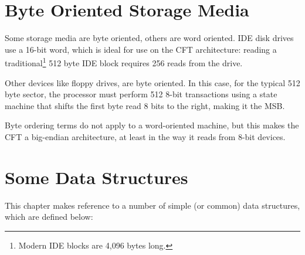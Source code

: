 \section{Byte Oriented Storage Media}

Some storage media are byte oriented, others are word oriented. IDE
disk drives use a 16-bit word, which is ideal for use on the CFT
architecture: reading a traditional\footnote{Modern IDE blocks are
  4,096 bytes long.} 512 byte IDE block requires 256 reads from the
drive.

Other devices like floppy drives, are byte oriented. In this case, for
the typical 512 byte sector, the processor must perform 512 8-bit
transactions using a state machine that shifts the first byte read 8
bits to the right, making it the MSB.

Byte ordering terms do not apply to a word-oriented machine, but this
makes the CFT a big-endian architecture, at least in the way it reads
from 8-bit devices.

\section{Some Data Structures}

This chapter makes reference to a number of simple (or common) data
structures, which are defined below:

